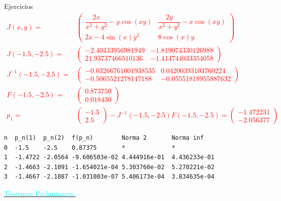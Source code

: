 \begin{frame}[fragile]{Ejercicios}
\small
\textcolor{red}{
\begin{align*}
J(x,y)=&\begin{pmatrix}
\dfrac{2x}{x^2+y^2}-y\cos(xy) & \dfrac{2y}{x^2+y^2}-x\cos(xy)\\
2x-4\sin(x)y^2 & 8 \cos(x)y 
\end{pmatrix}\\
J(-1.5,-2.5)=&
\begin{pmatrix}
 - 2.40433956981949  & - 1.819074330126988\\
 21.93737466510136   & - 1.414744033354058
\end{pmatrix}\\
J^{-1}(-1.5,-2.5)=&
\begin{pmatrix}
-0.03266761001938535 &  0.04200393103760224\\
-0.5065521278147188 &  - 0.05551818955887632
\end{pmatrix}\\
F(-1.5,-2.5)=&
\begin{pmatrix}
0.873750\\
0.018430
\end{pmatrix}\\
p_1=&
\begin{pmatrix}
-1.5\\
2.5
\end{pmatrix}
-J^{-1}(-1.5,-2.5)F(-1.5,-2.5)=
\begin{pmatrix}
-1.472231\\
-2.056377
\end{pmatrix}
\end{align*}}
\small
\begin{lstlisting}[style=mystyle,backgroundcolor=\color{gray!30}]
n  p_n(1)  p_n(2)  f(p_n)        Norma 2       Norma inf
0  -1.5    -2.5    0.87375       *             *
1  -1.4722 -2.0564 -9.606503e-02 4.444916e-01  4.436233e-01
2  -1.4663 -2.1091 -1.654021e-04 5.303760e-02  5.270221e-02
3  -1.4667 -2.1087 -1.031003e-07 5.406173e-04  3.834635e-04
\end{lstlisting}
\normalsize
\hyperlink{RetornoTeoremaPreliminares}{\textcolor{cyan}{Teoremas Preliminares.}} 
\end{frame}